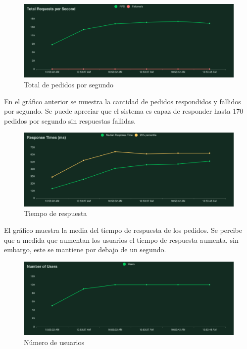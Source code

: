 \begin{figure}[H]
	\centering
	\includegraphics[width=0.9\linewidth]{Graphics/locust_total_requests_per_second}
	\caption{Total de pedidos por segundo}
	\label{fig:locusttotalrequestspersecond}
\end{figure}

En el gráfico anterior se muestra la cantidad de pedidos respondidos y fallidos por segundo. Se puede apreciar que el sistema es capaz de responder hasta 170 pedidos por segundo sin respuestas fallidas.

\begin{figure}[H]
	\centering
	\includegraphics[width=0.9\linewidth]{Graphics/locust_response_times_(ms)}
	\caption{Tiempo de respuesta}
	\label{fig:locustresponsetimesms}
\end{figure}

El gráfico muestra la media del tiempo de respuesta de los pedidos. Se percibe que a medida que aumentan los usuarios el tiempo de respuesta aumenta, sin embargo, este se mantiene por debajo de un segundo.

\begin{figure}[H]
	\centering
	\includegraphics[width=0.9\linewidth]{Graphics/locust_number_of_users}
	\caption{Número de usuarios}
	\label{fig:locustnumberofusers}
\end{figure}

